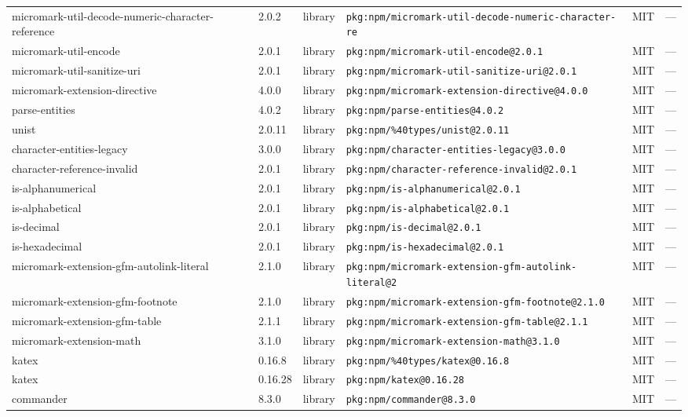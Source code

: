 \documentclass[11pt]{article}
\begin{document}
\begin{longtable}{|l|l|l|p{2.2cm}|l|p{4cm}|}
micromark-util-decode-numeric-character-reference & 2.0.2 & library & \texttt{pkg:npm/micromark-util-decode-numeric-character-re} & MIT & — \\
micromark-util-encode & 2.0.1 & library & \texttt{pkg:npm/micromark-util-encode@2.0.1} & MIT & — \\
micromark-util-sanitize-uri & 2.0.1 & library & \texttt{pkg:npm/micromark-util-sanitize-uri@2.0.1} & MIT & — \\
micromark-extension-directive & 4.0.0 & library & \texttt{pkg:npm/micromark-extension-directive@4.0.0} & MIT & — \\
parse-entities & 4.0.2 & library & \texttt{pkg:npm/parse-entities@4.0.2} & MIT & — \\
unist & 2.0.11 & library & \texttt{pkg:npm/\%40types/unist@2.0.11} & MIT & — \\
character-entities-legacy & 3.0.0 & library & \texttt{pkg:npm/character-entities-legacy@3.0.0} & MIT & — \\
character-reference-invalid & 2.0.1 & library & \texttt{pkg:npm/character-reference-invalid@2.0.1} & MIT & — \\
is-alphanumerical & 2.0.1 & library & \texttt{pkg:npm/is-alphanumerical@2.0.1} & MIT & — \\
is-alphabetical & 2.0.1 & library & \texttt{pkg:npm/is-alphabetical@2.0.1} & MIT & — \\
is-decimal & 2.0.1 & library & \texttt{pkg:npm/is-decimal@2.0.1} & MIT & — \\
is-hexadecimal & 2.0.1 & library & \texttt{pkg:npm/is-hexadecimal@2.0.1} & MIT & — \\
micromark-extension-gfm-autolink-literal & 2.1.0 & library & \texttt{pkg:npm/micromark-extension-gfm-autolink-literal@2} & MIT & — \\
micromark-extension-gfm-footnote & 2.1.0 & library & \texttt{pkg:npm/micromark-extension-gfm-footnote@2.1.0} & MIT & — \\
micromark-extension-gfm-table & 2.1.1 & library & \texttt{pkg:npm/micromark-extension-gfm-table@2.1.1} & MIT & — \\
micromark-extension-math & 3.1.0 & library & \texttt{pkg:npm/micromark-extension-math@3.1.0} & MIT & — \\
katex & 0.16.8 & library & \texttt{pkg:npm/\%40types/katex@0.16.8} & MIT & — \\
katex & 0.16.28 & library & \texttt{pkg:npm/katex@0.16.28} & MIT & — \\
commander & 8.3.0 & library & \texttt{pkg:npm/commander@8.3.0} & MIT & — \\

\end{longtable}
\end{document}
